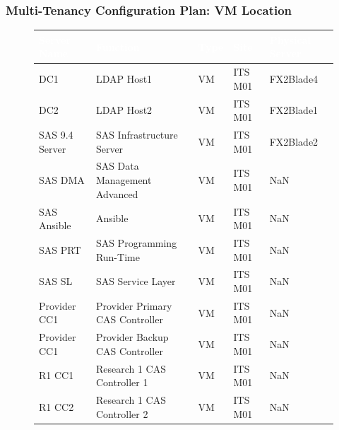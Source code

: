 \newpage 

\subsubsection{Multi-Tenancy Configuration Plan: VM Location}
\label{Multi-Tenancy Configuration Plan}

\begin{figure}[H]
\begin{center}
    \renewcommand{\arraystretch}{1.5}
    \begin{tabular}{|>{\raggedright\arraybackslash}l 
                    |>{\raggedright\arraybackslash}m{6cm} 
                    |>{\raggedright\arraybackslash}l 
                    |>{\raggedright\arraybackslash}l 
                    |>{\raggedright\arraybackslash}l 
                    |}
    \hline
    \rowcolor[HTML]{196fb4}\centering\textcolor{white}{\large Server Name} 
                            & \centering\textcolor{white}{\large Function} 
                            & \centering\textcolor{white}{\large Type} 
                            & \centering\textcolor{white}{\large Site} 
                            & \centering\textcolor{white}{\large Physical Server} 
                            \tabularnewline 
    \hline
    DC1	           & LDAP Host1                         & VM & ITS M01 & FX2Blade4 \\\hline
    DC2	           & LDAP Host2                         & VM & ITS M01 & FX2Blade1 \\\hline
    SAS 9.4 Server & SAS Infrastructure Server          & VM & ITS M01 & FX2Blade2 \\\hline
    SAS DMA	       & SAS Data Management Advanced       & VM & ITS M01 & NaN	\\\hline
    SAS Ansible	   & Ansible	                        & VM & ITS M01 & NaN	\\\hline
    SAS PRT	       & SAS Programming Run-Time	        & VM & ITS M01 & NaN	\\\hline
    SAS SL	       & SAS Service Layer	                & VM & ITS M01 & NaN	\\\hline
    Provider CC1   & Provider Primary CAS Controller    & VM & ITS M01 & NaN	\\\hline
    Provider CC1   & Provider Backup CAS Controller     & VM & ITS M01 & NaN	\\\hline
    R1 CC1	       & Research 1 CAS Controller 1	    & VM & ITS M01 & NaN	\\\hline
    R1 CC2	       & Research 1 CAS Controller 2	    & VM & ITS M01 & NaN	\\\hline

\end{tabular}
\end{center}
\end{figure}
